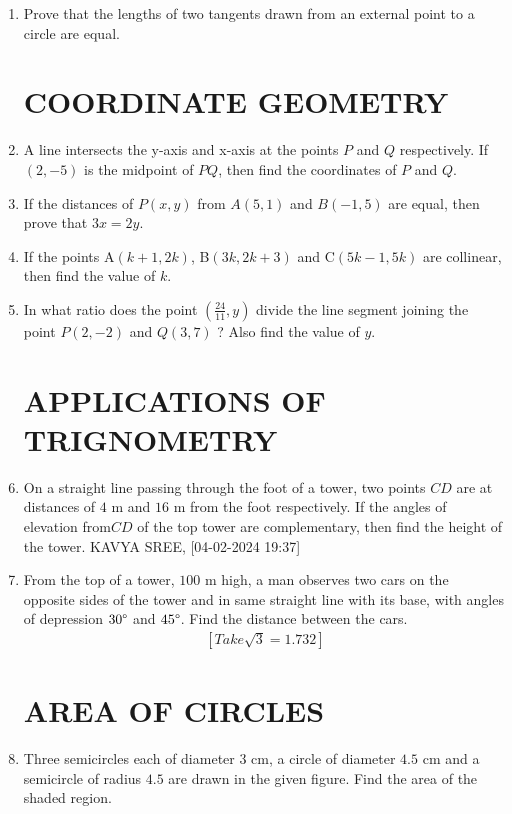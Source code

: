 \documentclass{article}
\providecommand{\brak}[1]{\ensuremath{\left(#1\right)}}
\begin{document}
\begin{enumerate}
\item Prove that the lengths of two tangents drawn from an external point to a circle are equal.

\section{COORDINATE GEOMETRY}

\item A line intersects the y-axis and x-axis at the points $P$ and $Q$ respectively. If $\brak {2,-5}$ is the midpoint of $P$$Q$, then find the coordinates of $P$ and $Q$.

\item If the distances of $P\brak{x,y}$ from $A\brak{5,1}$ and $B\brak{-1,5}$ are equal, then prove that $ 3x=2y$.

\item If the points A$\brak{k+1 ,2k}$, B$\brak{3k , 2k+3}$ and C$\brak{5k-1,5k}$ are collinear, then find the value of $k$.


\item In what ratio does the point $\brak{\frac{24}{11},y}$  divide the line segment joining the point $P\brak{2,-2}$ and $Q\brak{3,7}$ ? Also find the value of $y$.


\section{APPLICATIONS OF TRIGNOMETRY}

\item On a straight line passing through the foot of a tower, two points $C$$D$ are at distances of $4$ m
and $16$ m from the foot respectively. If the angles of elevation from$C$$D$ of the top tower are complementary, then find the height of the tower.
KAVYA SREE, [04-02-2024 19:37]
\item From the top of a tower, $100$ m high, a man observes two cars on the opposite sides of the tower and in same straight line with its base, with angles of depression $30\degree$ and $45\degree$. Find the distance between the cars.
\begin{align*}
    \ [Take   \sqrt{3} = 1.732]
\end{align*}

\section{AREA OF CIRCLES}

\item Three semicircles each of diameter $3$ cm, a circle of diameter $4.5$ cm and a semicircle of radius $4.5$ are drawn in the given figure. Find the area of the shaded region.



\end{enumerate}
\end{document}
